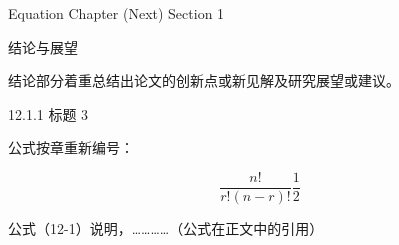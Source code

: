 \documentclass[UTF8, scheme=chinese, openany, oneside]{ctexbook}
\begin{document}
\newpage
{}
\vspace*{5cm}
\begin{center}
{\color{white} Equation Chapter (Next) Section 1}
\end{center}

\clearpage
\setcounter{chapter}{11} %
\setcounter{page}{25}    %


\vspace{1cm}
\begin{center}
    { \quad 结论与展望}
\end{center}
\vspace{0.8cm}

\noindent \hspace{2em} 结论部分着重总结出论文的创新点或新见解及研究展望或建议。

\vspace{0.8cm}


\vspace{0.3cm}
\noindent \hspace{2em} { 12.1.1 \quad 标题 3}

\vspace{1.2cm}

\noindent \hspace{2em} 公式按章重新编号：

\vspace{0.6cm}

\begin{equation}
    \frac{n!}{r!(n-r)!} \frac{1}{2} \tag{12-1} \label{eq:12-1}
\end{equation}

\vspace{1.8cm}

\noindent \hspace{2em} 公式（12-1）说明，…………（公式在正文中的引用）
\end{document}
